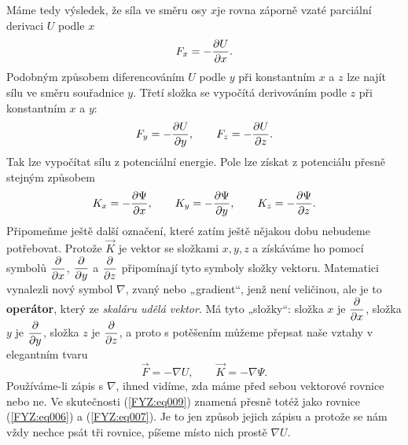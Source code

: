 {    Máme tedy výsledek, že síla ve směru osy \(x\)je rovna záporně vzaté parciální derivaci \(U\) 
    podle \(x\)
    \begin{equation}\label{FYZ:eq006}
      F_x = -\dfrac{\partial U}{\partial x}.
    \end{equation}
    Podobným způsobem diferencováním \(U\) podle \(y\) při konstantním \(x\) a \(z\) lze najít sílu 
    ve směru souřadnice \(y\). Třetí složka se vypočítá derivováním podle \(z\) při konstantním 
    \(x\) a \(y\):
    \begin{equation}\label{FYZ:eq007}
      F_y = -\dfrac{\partial U}{\partial y}, \qquad  F_z = -\dfrac{\partial U}{\partial z}.
    \end{equation}
    Tak lze vypočítat sílu z potenciální energie. Pole lze získat z potenciálu přesně stejným 
    způsobem
    \begin{equation}\label{fyz:eq008}
      K_x = - \dfrac{\partial \Psi}{\partial x},\qquad K_y = - \dfrac{\partial \Psi}{\partial y},\qquad K_z = - \dfrac{\partial \Psi}{\partial z}.
    \end{equation}
    Připomeňme ještě další označení, které zatím ještě nějakou dobu nebudeme potřebovat. Protože 
    \(\vec{K}\) je vektor se složkami \(x, y, z\) a získáváme ho pomocí symbolů \(\dfrac{\partial  }{\partial x}\), 
    \(\dfrac{\partial  }{\partial y}\) a \(\dfrac{\partial  }{\partial z}\) připomínají tyto symboly složky vektoru. Matematici vynalezli 
    nový symbol \(\nabla\), zvaný  nebo „gradient“, jenž není veličinou, ale je to 
    \textbf{operátor}, který ze \emph{skaláru udělá vektor}. Má tyto „složky“: složka \(x\) je 
    \(\dfrac{\partial  }{\partial x}\), složka \(y\) je \(\dfrac{\partial  }{\partial y}\), složka \(z\) je \(\dfrac{\partial  }{\partial z}\), a proto s 
    potěšením můžeme přepsat naše vztahy v elegantním tvaru
    \begin{equation}\label{FYZ:eq009}
      \vec{F} = -\nabla U, \qquad  \vec{K} = -\nabla\Psi.
    \end{equation}
    Používáme-li zápis s \(\nabla\), ihned vidíme, zda máme před sebou vektorové rovnice nebo ne. 
    Ve skutečnosti (\ref{FYZ:eq009}) znamená přesně totéž jako rovnice (\ref{FYZ:eq006}) a 
    (\ref{FYZ:eq007}). Je to jen způsob jejich zápisu a protože se nám vždy nechce psát tři 
    rovnice, píšeme místo nich prostě \(\nabla U\).
    
}
